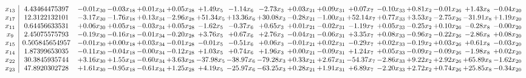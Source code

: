 \documentclass[9pt]{article}
\begin{document}
 \[\begin{array}{c| c c@{\hskip 2pt} c@{\hskip 2pt} c@{\hskip 2pt} c@{\hskip 2pt} c@{\hskip 2pt} c@{\hskip 2pt} c@{\hskip 2pt} c@{\hskip 2pt} c@{\hskip 2pt} c@{\hskip 2pt} c@{\hskip 2pt} c@{\hskip 2pt} c@{\hskip 2pt} c@{\hskip 2pt} c@{\hskip 2pt} }
 x_{13}   &  4.43464475397 & -0.01 x_{30} & -0.03 x_{18} & +  0.01 x_{34} & +  0.05 x_{28} & +  1.49 x_{5} & -1.14 x_{6} & -2.73 x_{3} & +  0.03 x_{21} & +  0.09 x_{31} & +  0.07 x_{7} & -0.10 x_{33} & +  0.81 x_{2} & -0.01 x_{26} & +  1.43 x_{8} & -0.04 x_{20}\\
 x_{17}   &  12.3122132101 & -3.17 x_{30} & -1.76 x_{18} & +  0.13 x_{34} & -2.96 x_{28} & + 51.34 x_{5} & + 13.36 x_{6} & + 30.08 x_{3} & -0.28 x_{21} & -1.00 x_{31} & + 52.14 x_{7} & +  0.77 x_{33} & +  3.53 x_{2} & -2.75 x_{26} & -31.91 x_{8} & +  1.19 x_{20}\\
 x_{11}   &  0.64456633531 & +  0.06 x_{30} & +  0.05 x_{18} & -0.03 x_{34} & +  0.05 x_{28} & -1.62 x_{5} & -0.37 x_{6} & +  0.65 x_{3} & +  0.01 x_{21} & -0.02 x_{31} & -1.19 x_{7} & +  0.05 x_{33} & -0.25 x_{2} & +  0.10 x_{26} & -0.28 x_{8} & -0.00 x_{20}\\
 x_{9}   &  2.45075575793 & -0.19 x_{30} & -0.16 x_{18} & -0.01 x_{34} & -0.20 x_{28} & +  3.76 x_{5} & +  0.67 x_{6} & +  2.76 x_{3} & -0.04 x_{21} & -0.06 x_{31} & +  3.35 x_{7} & +  0.08 x_{33} & -0.96 x_{2} & -0.22 x_{26} & -2.86 x_{8} & +  0.08 x_{20}\\
 x_{15}   &  0.505845654957 & -0.01 x_{30} & +  0.00 x_{18} & +  0.03 x_{34} & -0.01 x_{28} & -0.01 x_{5} & -0.51 x_{6} & +  0.06 x_{3} & -0.01 x_{21} & +  0.02 x_{31} & -0.29 x_{7} & +  0.02 x_{33} & -0.19 x_{2} & +  0.03 x_{26} & +  0.61 x_{8} & -0.03 x_{20}\\
 x_{14}   &  1.87399653035 & -0.11 x_{30} & -0.04 x_{18} & -0.00 x_{34} & -0.12 x_{28} & +  1.03 x_{5} & +  0.74 x_{6} & +  1.96 x_{3} & +  0.00 x_{21} & -0.09 x_{31} & +  1.24 x_{7} & +  0.05 x_{33} & -0.09 x_{2} & -0.09 x_{26} & -1.98 x_{8} & +  0.02 x_{20}\\
 x_{22}   &  30.3845935744 & +  3.16 x_{30} & +  1.55 x_{18} & -0.60 x_{34} & +  3.63 x_{28} & -37.98 x_{5} & -38.97 x_{6} & -79.28 x_{3} & +  0.33 x_{21} & +  2.67 x_{31} & -54.37 x_{7} & -2.86 x_{33} & +  9.22 x_{2} & +  2.92 x_{26} & + 65.89 x_{8} & -1.62 x_{20}\\
 x_{23}   &  47.8920302728 & +  1.61 x_{30} & -0.95 x_{18} & -0.61 x_{34} & +  1.25 x_{28} & +  4.19 x_{5} & -25.97 x_{6} & -63.25 x_{3} & +  0.28 x_{21} & +  1.91 x_{31} & +  6.89 x_{7} & -2.20 x_{33} & +  2.72 x_{2} & +  0.74 x_{26} & + 25.85 x_{8} & -0.34 x_{20}\\

\end{array}\]
\end{document}
